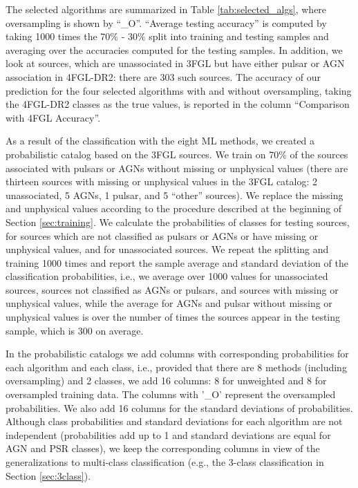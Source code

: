 \documentclass{aa}
\begin{document}
The selected algorithms are summarized in Table \ref{tab:selected_algs}, where oversampling is shown by ``\_O''.
``Average testing accuracy'' is computed by taking 1000 times the 70\% - 30\% split into training and testing samples and averaging over the 
accuracies computed for the testing samples.
In addition, we look at sources, which are unassociated in 3FGL but have either pulsar or AGN association in 4FGL-DR2: there are 303 such sources.
The accuracy of our prediction for the four selected algorithms with and without oversampling, taking the 4FGL-DR2 classes as the true values, is reported in the column ``Comparison with 4FGL Accuracy''.

As a result of the classification with the eight ML methods,
we created a probabilistic catalog based on the 3FGL sources.
We train on 70\% of the sources associated with pulsars or AGNs without missing or unphysical values 
(there are thirteen sources with missing or unphysical values in the 3FGL catalog: 2 unassociated, 5 AGNs, 1 pulsar, and 5 ``other'' sources).
We replace the missing and unphysical values according to the procedure described at the beginning of Section \ref{sec:training}.
We calculate the probabilities of classes for testing sources, for sources which are not classified as pulsars or AGNs or have missing or unphysical values, and for unassociated sources.
We repeat the splitting and training 1000 times and report the sample average and standard deviation of the classification probabilities,
i.e., we average over 1000 values for unassociated sources, sources not classified as AGNs or pulsars, and sources with missing or unphysical values,
while the average for AGNs and pulsar without missing or unphysical values is over the number of times the sources appear in the testing sample, which is 300 on average.


In the probabilistic catalogs we add columns with corresponding probabilities for each algorithm and each class,
i.e., provided that there are 8 methods (including oversampling) and 2 classes, we add 16 columns: 8 for unweighted and 8 for oversampled training data. The columns with '\_O' represent the oversampled probabilities. We also add 16 columns for the standard deviations of probabilities. Although class probabilities and standard deviations for each algorithm are not independent (probabilities add up to 1 and standard deviations are equal for AGN and PSR classes), we keep the corresponding columns in view of the generalizations to multi-class classification (e.g., the 3-class classification in Section \ref{sec:3class}).
\end{document}
